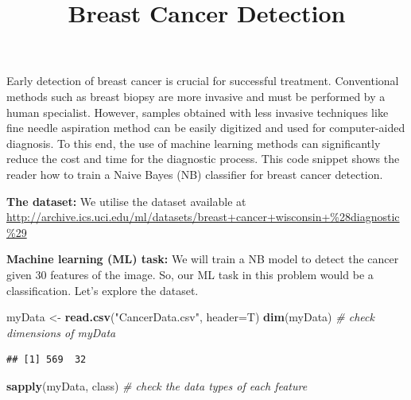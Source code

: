 \documentclass[]{article}
\title{Breast Cancer Detection}
\author{}
\date{}
\newenvironment{Shaded}{\begin{snugshade}}{\end{snugshade}}
\newcommand{\CommentTok}[1]{\textcolor[rgb]{0.56,0.35,0.01}{\textit{#1}}}
\newcommand{\DataTypeTok}[1]{\textcolor[rgb]{0.13,0.29,0.53}{#1}}
\newcommand{\KeywordTok}[1]{\textcolor[rgb]{0.13,0.29,0.53}{\textbf{#1}}}
\newcommand{\NormalTok}[1]{#1}
\newcommand{\StringTok}[1]{\textcolor[rgb]{0.31,0.60,0.02}{#1}}
\begin{document}
\maketitle

Early detection of breast cancer is crucial for successful treatment.
Conventional methods such as breast biopsy are more invasive and must be
performed by a human specialist. However, samples obtained with less
invasive techniques like fine needle aspiration method can be easily
digitized and used for computer-aided diagnosis. To this end, the use of
machine learning methods can significantly reduce the cost and time for
the diagnostic process. This code snippet shows the reader how to train
a Naive Bayes (NB) classifier for breast cancer detection.

\textbf{The dataset:} We utilise the dataset available at
\url{http://archive.ics.uci.edu/ml/datasets/breast+cancer+wisconsin+\%28diagnostic\%29}

\textbf{Machine learning (ML) task:} We will train a NB model to detect
the cancer given 30 features of the image. So, our ML task in this
problem would be a classification. Let's explore the dataset.

\begin{Shaded}
\begin{Highlighting}[]
\NormalTok{myData <-}\StringTok{ }\KeywordTok{read.csv}\NormalTok{(}\StringTok{"CancerData.csv"}\NormalTok{, }\DataTypeTok{header=}\NormalTok{T)}
\KeywordTok{dim}\NormalTok{(myData) }\CommentTok{# check dimensions of myData}
\end{Highlighting}
\end{Shaded}

\begin{verbatim}
## [1] 569  32
\end{verbatim}

\begin{Shaded}
\begin{Highlighting}[]
\KeywordTok{sapply}\NormalTok{(myData, class) }\CommentTok{# check the data types of each feature}
\end{Highlighting}
\end{Shaded}
\end{document}
